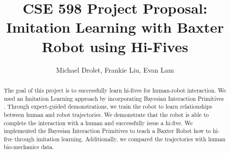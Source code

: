 \documentclass[letterpaper, 10 pt, conference]{ieeeconf}  %
\title{\LARGE \bf
CSE 598 Project Proposal: \\
Imitation Learning with Baxter Robot using Hi-Fives
}
\author{Michael Drolet, Frankie Liu, Evan Lam}
\begin{document}
\maketitle
\thispagestyle{empty}
\pagestyle{empty}


\begin{abstract}
The goal of this project is to successfully learn hi-fives for human-robot interaction. We used an Imitation Learning approach by incorporating Bayesian Interaction Primitives \cite{c1}. Through expert-guided demonstrations, we train the robot to learn relationships between human and robot trajectories. We demonstrate that the robot is able to complete the interaction with a human and successfully issue a hi-five. We implemented the Bayesian Interaction Primitives to teach a Baxter Robot how to hi-five through imitation learning. Additionally, we compared the trajectories with human bio-mechanics data.
\end{abstract}


\end{document}
